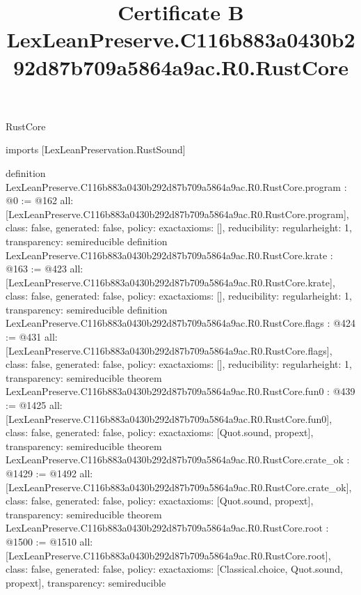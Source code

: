 \begin{lexlean}{RustCore}
\title{Certificate B LexLeanPreserve.C116b883a0430b292d87b709a5864a9ac.R0.RustCore}
\begin{coremodule}
imports [LexLeanPreservation.RustSound]

definition LexLeanPreserve.C116b883a0430b292d87b709a5864a9ac.R0.RustCore.program : @0 := @162 {
  all: [LexLeanPreserve.C116b883a0430b292d87b709a5864a9ac.R0.RustCore.program],
  class: false,
  generated: false,
  policy: exact{axioms: []},
  reducibility: regular{height: 1},
  transparency: semireducible
}
definition LexLeanPreserve.C116b883a0430b292d87b709a5864a9ac.R0.RustCore.krate : @163 := @423 {
  all: [LexLeanPreserve.C116b883a0430b292d87b709a5864a9ac.R0.RustCore.krate],
  class: false,
  generated: false,
  policy: exact{axioms: []},
  reducibility: regular{height: 1},
  transparency: semireducible
}
definition LexLeanPreserve.C116b883a0430b292d87b709a5864a9ac.R0.RustCore.flags : @424 := @431 {
  all: [LexLeanPreserve.C116b883a0430b292d87b709a5864a9ac.R0.RustCore.flags],
  class: false,
  generated: false,
  policy: exact{axioms: []},
  reducibility: regular{height: 1},
  transparency: semireducible
}
theorem LexLeanPreserve.C116b883a0430b292d87b709a5864a9ac.R0.RustCore.fun0 : @439 := @1425 {
  all: [LexLeanPreserve.C116b883a0430b292d87b709a5864a9ac.R0.RustCore.fun0],
  class: false,
  generated: false,
  policy: exact{axioms: [Quot.sound, propext]},
  transparency: semireducible
}
theorem LexLeanPreserve.C116b883a0430b292d87b709a5864a9ac.R0.RustCore.crate_ok : @1429 := @1492 {
  all: [LexLeanPreserve.C116b883a0430b292d87b709a5864a9ac.R0.RustCore.crate_ok],
  class: false,
  generated: false,
  policy: exact{axioms: [Quot.sound, propext]},
  transparency: semireducible
}
theorem LexLeanPreserve.C116b883a0430b292d87b709a5864a9ac.R0.RustCore.root : @1500 := @1510 {
  all: [LexLeanPreserve.C116b883a0430b292d87b709a5864a9ac.R0.RustCore.root],
  class: false,
  generated: false,
  policy: exact{axioms: [Classical.choice, Quot.sound, propext]},
  transparency: semireducible
}


\end{coremodule}
\end{lexlean}
